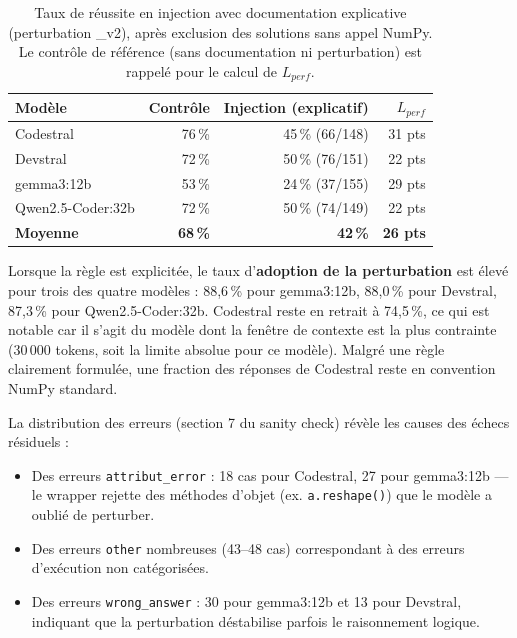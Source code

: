 \documentclass[11pt, a4paper]{article}
\begin{document}
\begin{table}[htbp]
\centering
\caption{Taux de réussite en injection avec documentation explicative (perturbation \_v2), après exclusion des solutions sans appel NumPy. Le contrôle de référence (sans documentation ni perturbation) est rappelé pour le calcul de $L_{perf}$.}
\label{tab:results_exp}
\begin{tabular}{lrrr}
\toprule
\textbf{Modèle} & \textbf{Contrôle} & \textbf{Injection (explicatif)} & \textbf{$L_{perf}$} \\
\midrule
Codestral         & 76\,\% & 45\,\% (66/148) & 31 pts \\
Devstral          & 72\,\% & 50\,\% (76/151) & 22 pts \\
gemma3:12b        & 53\,\% & 24\,\% (37/155) & 29 pts \\
Qwen2.5-Coder:32b & 72\,\% & 50\,\% (74/149) & 22 pts \\
\midrule
\textbf{Moyenne}  & \textbf{68\,\%} & \textbf{42\,\%} & \textbf{26 pts} \\
\bottomrule
\end{tabular}
\end{table}

Lorsque la règle est explicitée, le taux d'\textbf{adoption de la perturbation} est élevé pour trois des quatre modèles : 88,6\,\% pour gemma3:12b, 88,0\,\% pour Devstral, 87,3\,\% pour Qwen2.5-Coder:32b. Codestral reste en retrait à 74,5\,\%, ce qui est notable car il s'agit du modèle dont la fenêtre de contexte est la plus contrainte (30\,000 tokens, soit la limite absolue pour ce modèle). Malgré une règle clairement formulée, une fraction des réponses de Codestral reste en convention NumPy standard.

La distribution des erreurs (section 7 du sanity check) révèle les causes des échecs résiduels :
\begin{itemize}
    \item Des erreurs \texttt{attribut\_error} : 18 cas pour Codestral, 27 pour gemma3:12b — le wrapper rejette des méthodes d'objet (ex. \texttt{a.reshape()}) que le modèle a oublié de perturber.
    \item Des erreurs \texttt{other} nombreuses (43--48 cas) correspondant à des erreurs d'exécution non catégorisées.
    \item Des erreurs \texttt{wrong\_answer} : 30 pour gemma3:12b et 13 pour Devstral, indiquant que la perturbation déstabilise parfois le raisonnement logique.
\end{itemize}
\end{document}
